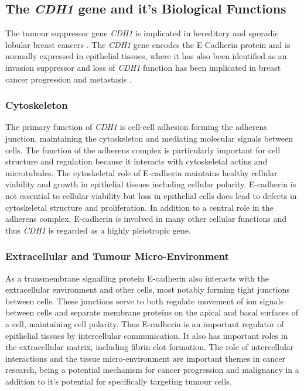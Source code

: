 \subsection{The \textit{CDH1} gene and it's Biological Functions}
The tumour suppressor gene \textit{CDH1} is implicated in hereditary and sporadic lobular breast cancers \cite{Berx1996,DeLeeuw1997,Berx2009,Vos1997,Semb1998,Masciari2007}. The \textit{CDH1} gene encodes the E-Cadherin protein and is normally expressed in epithelial tissues, where it has also been identified as an invasion suppressor and loss of \textit{CDH1} function has been implicated in breast cancer progression and metastasis \cite{Berx1995,Becker1994,Christofori1999}.

\subsubsection{Cytoskeleton}
The primary function of \textit{CDH1} is cell-cell adhesion forming the adherens junction, maintaining the cytoskeleton and mediating molecular signals between cells. The function of the adherens complex is particularly important for cell structure and regulation because it interacts with cytoskeletal actins and microtubules. The cytoskeletal role of E-cadherin maintains healthy cellular viability and growth in epithelial tissues including cellular polarity. E-cadherin is not essential to cellular viability but loss in epithelial cells does lead to defects in cytoskeletal structure and proliferation. In addition to a central role in the adherens complex, E-cadherin is involved in many other cellular functions and thus \textit{CDH1} is regarded as a highly pleiotropic gene.

\subsubsection{Extracellular and Tumour Micro-Environment}
As a transmembrane signalling protein E-cadherin also interacts with the extracellular environment and other cells, most notably forming tight junctions between cells. These junctions serve to both regulate movement of ion signals between cells and separate membrane proteins on the apical and basal surfaces of a cell, maintaining cell polarity. Thus E-cadherin is an important regulator of epithelial tissues by intercellular communication. It also has important roles in the extracellular matrix, including fibrin clot formation. The role of intercellular interactions and the tissue micro-environment are important themes in cancer research, being a potential mechanism for cancer progression and malignancy in a addition to it's potential for specifically targeting tumour cells.

